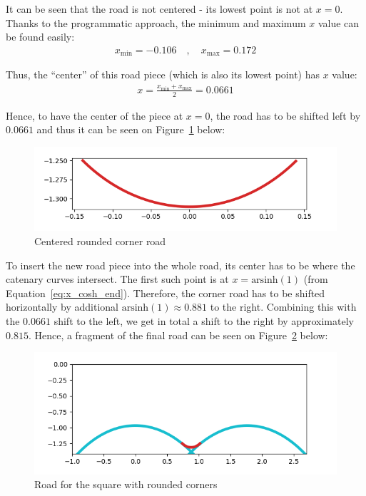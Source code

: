 \documentclass[12pt]{article}
\begin{document}
        It can be seen that the road is not centered - its lowest point is not at $x=0$. Thanks to the programmatic approach, the minimum and maximum $x$ value can be found easily:
        \begin{align*}
            x_{\text{min}} = -0.106 \quad , \quad x_{\text{max}} = 0.172
        \end{align*}

        Thus, the ``center'' of this road piece (which is also its lowest point) has $x$ value:
        \begin{align}
            x = \frac{x_{\text{min}}+x_{\text{max}}}{2} = 0.0661
        \end{align}

        Hence, to have the center of the piece at $x=0$, the road has to be shifted left by $0.0661$ and thus it can be seen on Figure~\ref{fig:corner_road_centered} below:
        \begin{figure}[H]
            \includegraphics[width=\linewidth]{images/centered_corner_road.png}
            \caption{Centered rounded corner road}\label{fig:corner_road_centered}
        \end{figure}

        To insert the new road piece into the whole road, its center has to be where the catenary curves intersect. The first such point is at $x=\text{arsinh}(1)$ (from Equation~\ref{eq:x_cosh_end}). Therefore, the corner road has to be shifted horizontally by additional $\text{arsinh}(1) \approx 0.881$ to the right. Combining this with the $0.0661$ shift to the left, we get in total a shift to the right by approximately $0.815$. Hence, a fragment of the final road can be seen on Figure~\ref{fig:corner_road_full} below:
        \begin{figure}[H]
            \includegraphics[width=\linewidth]{images/road_with_corner.png}
            \caption{Road for the square with rounded corners}\label{fig:corner_road_full}
        \end{figure}
\end{document}
